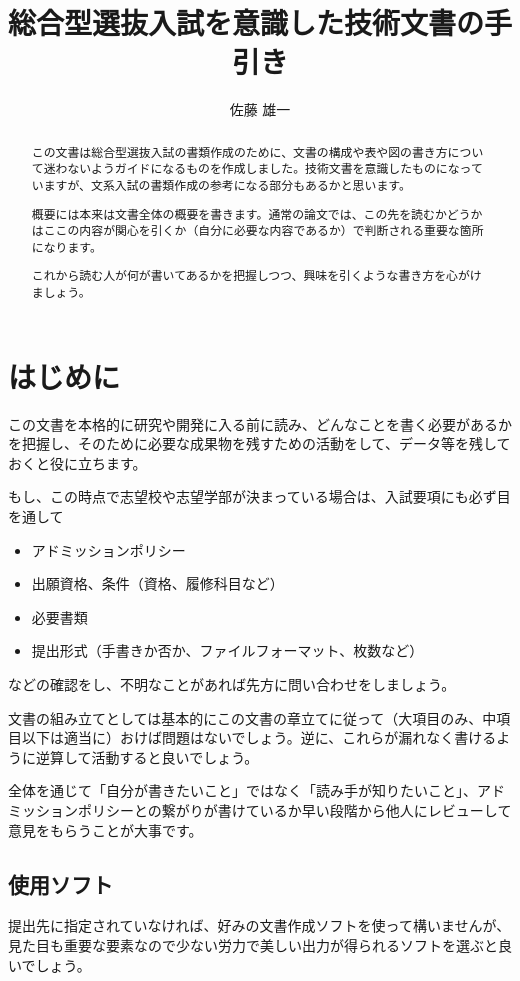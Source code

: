 \documentclass[dvipdfmx, a4paper]{jsarticle}
\title{総合型選抜入試を意識した技術文書の手引き}
\author{佐藤 雄一}
\begin{document}
\maketitle
\begin{abstract}
この文書は総合型選抜入試の書類作成のために、文書の構成や表や図の書き方について迷わないようガイドになるものを作成しました。技術文書を意識したものになっていますが、文系入試の書類作成の参考になる部分もあるかと思います。

概要には本来は文書全体の概要を書きます。通常の論文では、この先を読むかどうかはここの内容が関心を引くか（自分に必要な内容であるか）で判断される重要な箇所になります。

これから読む人が何が書いてあるかを把握しつつ、興味を引くような書き方を心がけましょう。
\end{abstract}

\section{はじめに}
この文書を本格的に研究や開発に入る前に読み、どんなことを書く必要があるかを把握し、そのために必要な成果物を残すための活動をして、データ等を残しておくと役に立ちます。

もし、この時点で志望校や志望学部が決まっている場合は、入試要項にも必ず目を通して
\begin{itemize}
    \item アドミッションポリシー
    \item 出願資格、条件（資格、履修科目など）
    \item 必要書類
    \item 提出形式（手書きか否か、ファイルフォーマット、枚数など）
\end{itemize}
などの確認をし、不明なことがあれば先方に問い合わせをしましょう。

文書の組み立てとしては基本的にこの文書の章立てに従って（大項目のみ、中項目以下は適当に）おけば問題はないでしょう。逆に、これらが漏れなく書けるように逆算して活動すると良いでしょう。

全体を通じて「自分が書きたいこと」ではなく「読み手が知りたいこと」、アドミッションポリシーとの繋がりが書けているか早い段階から他人にレビューして意見をもらうことが大事です。

\subsection{使用ソフト}
提出先に指定されていなければ、好みの文書作成ソフトを使って構いませんが、見た目も重要な要素なので少ない労力で美しい出力が得られるソフトを選ぶと良いでしょう。
\end{document}
